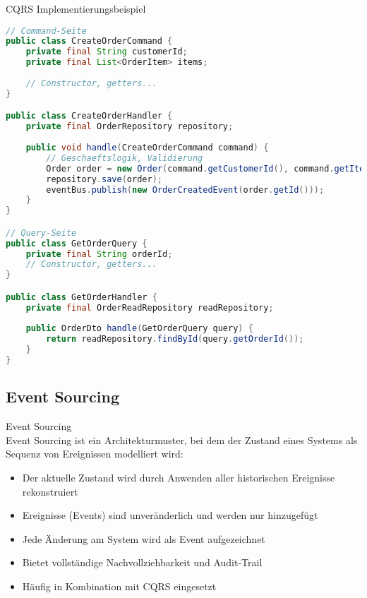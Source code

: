 \begin{examplecode}{CQRS Implementierungsbeispiel}\\
\begin{lstlisting}[language=Java, style=basesmol]
// Command-Seite
public class CreateOrderCommand {
    private final String customerId;
    private final List<OrderItem> items;
    
    // Constructor, getters...
}

public class CreateOrderHandler {
    private final OrderRepository repository;
    
    public void handle(CreateOrderCommand command) {
        // Geschaeftslogik, Validierung
        Order order = new Order(command.getCustomerId(), command.getItems());
        repository.save(order);
        eventBus.publish(new OrderCreatedEvent(order.getId()));
    }
}

// Query-Seite
public class GetOrderQuery {
    private final String orderId;
    // Constructor, getters...
}

public class GetOrderHandler {
    private final OrderReadRepository readRepository;
    
    public OrderDto handle(GetOrderQuery query) {
        return readRepository.findById(query.getOrderId());
    }
}
\end{lstlisting}
\end{examplecode}

\subsection{Event Sourcing}

\begin{definition}{Event Sourcing}\\
    Event Sourcing ist ein Architekturmuster, bei dem der Zustand eines Systems als Sequenz von Ereignissen modelliert wird:
    \begin{itemize}
        \item Der aktuelle Zustand wird durch Anwenden aller historischen Ereignisse rekonstruiert
        \item Ereignisse (Events) sind unveränderlich und werden nur hinzugefügt
        \item Jede Änderung am System wird als Event aufgezeichnet
        \item Bietet vollständige Nachvollziehbarkeit und Audit-Trail
        \item Häufig in Kombination mit CQRS eingesetzt
    \end{itemize}
\end{definition}

